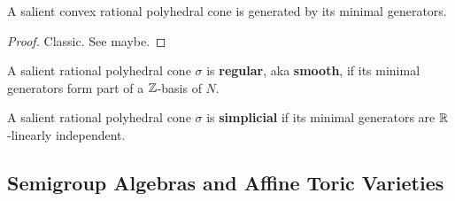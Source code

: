 \begin{lemma}
  \label{1-2-15-cone-hull-min-gen}

  A salient convex rational polyhedral cone is generated by its minimal generators.
\end{lemma}
\begin{proof}
  \uses{}

  Classic. See \cite{Oda_1988} maybe.
\end{proof}


\begin{definition}
  \label{1-2-16-reg-cone}

  A salient rational polyhedral cone $\sigma$ is {\bf regular}, aka {\bf smooth}, if its minimal generators form part of a ${\mathbb Z}$-basis of $N$.
\end{definition}


\begin{definition}
  \label{1-2-16-simplicial-cone}

  A salient rational polyhedral cone $\sigma$ is {\bf simplicial} if its minimal generators are ${\mathbb R}$-linearly independent.
\end{definition}


\subsection{Semigroup Algebras and Affine Toric Varieties}


